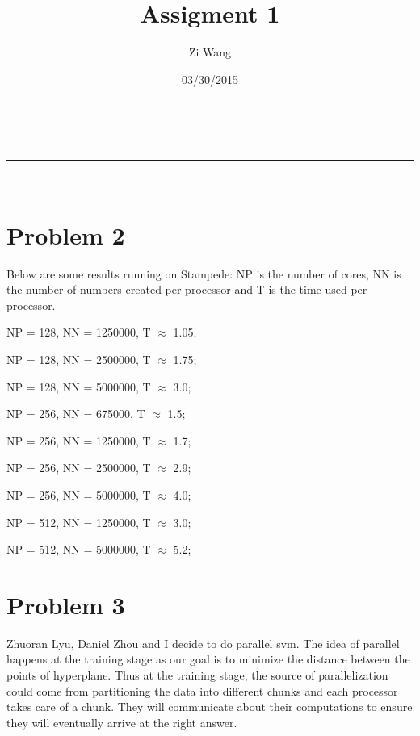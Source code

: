 \documentclass[a4paper,11pt]{article}
\makeatletter
\newcommand{\linia}{\rule{\linewidth}{0.5pt}}
\theoremstyle{mytheor}
\theoremstyle{mytheor}
\renewcommand{\maketitle}{
\begin{center}
\vspace{2ex}
{\huge \textsc{\@title}}
\vspace{1ex}
\\
\linia\\
\@author \hfill \@date
\vspace{4ex}
\end{center}
}
\makeatother
\begin{document}
\title{Assigment 1}

\author{Zi Wang}

\date{03/30/2015}

\maketitle

\section{Problem 2}
Below are some results running on Stampede: NP is the number of cores, NN is the number of numbers created per processor and T is the time used per processor.

NP = 128, NN = 1250000, T $\approx$ 1.05;

NP = 128, NN = 2500000, T $\approx$ 1.75;

NP = 128, NN = 5000000, T $\approx$ 3.0;

NP = 256, NN = 675000, T $\approx$ 1.5;

NP = 256, NN = 1250000, T $\approx$ 1.7;

NP = 256, NN = 2500000, T $\approx$ 2.9;

NP = 256, NN = 5000000, T $\approx$ 4.0;

NP = 512, NN = 1250000, T $\approx$ 3.0;

NP = 512, NN = 5000000, T $\approx$ 5.2;


\section{Problem 3}

Zhuoran Lyu, Daniel Zhou and I decide to do parallel svm. The idea of parallel happens at the training stage as our goal is to minimize the distance between the points of hyperplane. Thus at the training stage, the source of parallelization could come from partitioning the data into different chunks and each processor takes care of a chunk. They will communicate about their computations to ensure they will eventually arrive at the right answer.
\end{document}
